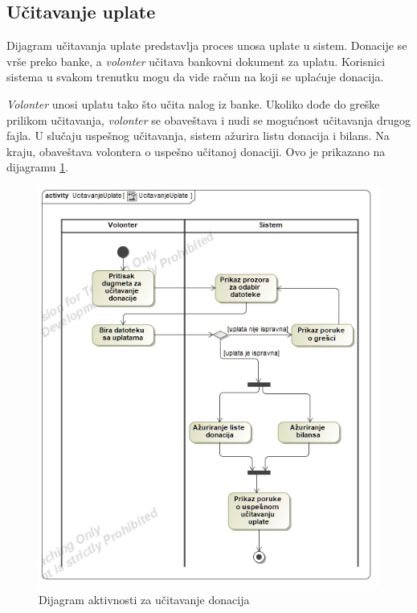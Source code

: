 \subsection{Učitavanje uplate}
\par Dijagram učitavanja uplate predstavlja proces unosa uplate u sistem. Donacije se vrše preko banke, a \textit{volonter} učitava bankovni dokument za uplatu.
Korisnici sistema u svakom trenutku mogu da vide račun na koji se uplaćuje donacija.
\par \textit{Volonter} unosi uplatu tako što učita nalog iz banke. Ukoliko dođe do greške prilikom učitavanja, \textit{volonter} se obaveštava i nudi se mogućnost
učitavanja drugog fajla. U slučaju uspešnog učitavanja, sistem ažurira listu donacija i bilans. Na kraju, obaveštava volontera o uspešno učitanoj donaciji.
Ovo je prikazano na dijagramu \ref{fig:activity-load-donation}.
\begin{figure}[ht]
    \centering
    \includegraphics[width=\textwidth, height=\textwidth]{img/load_donation.jpg}
    \caption{Dijagram aktivnosti za učitavanje donacija}
    \label{fig:activity-load-donation}
\end{figure}

